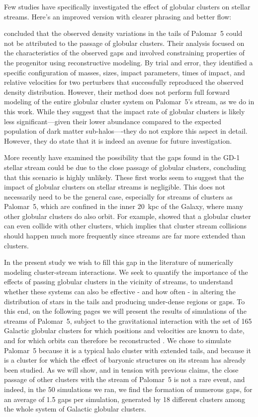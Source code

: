 \documentclass{aa}
\begin{document}
  Few studies have specifically investigated the effect of globular clusters on stellar streams. Here's an improved version with clearer phrasing and better flow:

  \citet{2017MNRAS.470...60E} concluded that the observed density variations in the tails of Palomar~5 could not be attributed to the passage of globular clusters. Their analysis focused on the characteristics of the observed gaps and involved constraining properties of the progenitor using reconstructive modeling. By trial and error, they identified a specific configuration of masses, sizes, impact parameters, times of impact, and relative velocities for two perturbers that successfully reproduced the observed density distribution. However, their method does not perform full forward modeling of the entire globular cluster system on Palomar~5's stream, as we do in this work. While they suggest that the impact rate of globular clusters is likely less significant—given their lower abundance compared to the expected population of dark matter sub-halos—-they do not explore this aspect in detail. However, they do state that it is indeed an avenue for future investigation. 
  
  More recently \citet{2022ApJ...941..129D} have examined the possibility that the gaps found in the GD-1 stellar stream could be due to the close passage of globular clusters, concluding that this scenario is highly unlikely. These first works seem to suggest that the impact of globular clusters on stellar streams is negligible. This does not necessarily need to be the general case, especially for streams of clusters as Palomar~5, which are confined in the inner 20~kpc of the Galaxy, where many other globular clusters do also orbit. For example, \citet{2023A&A...678A..69I} showed that a globular cluster can even collide with other clusters, which implies that cluster stream collisions should happen much more frequently since streams are far more extended than clusters. 
  
  In the present study we wish to fill this gap in the literature of numerically modeling cluster-stream interactions. We seek to quantify the importance of the effects of passing globular clusters in the vicinity of streams, to understand whether these systems can also be effective - and how often - in altering the distribution of stars in the tails and producing under-dense regions or gaps. To this end, on the following pages we will present the results of simulations of the streams of Palomar~5, subject to the gravitational interaction with the set of 165 Galactic globular clusters for which positions and velocities are known to date, and for which orbits can therefore be reconstructed \citep{2021MNRAS.505.5957B}. We chose to simulate Palomar~5 because it is a typical halo cluster with extended tails, and because it is a cluster for which the effect of baryonic structures on its stream has already been studied. As we will show, and in tension with previous claims, the close passage of other clusters with the stream of Palomar~5 is not a rare event, and indeed, in the 50 simulations we ran, we find the formation of numerous gaps, for an average of 1.5 gaps per simulation, generated by 18 different clusters among the whole system of Galactic globular clusters.
\end{document}
